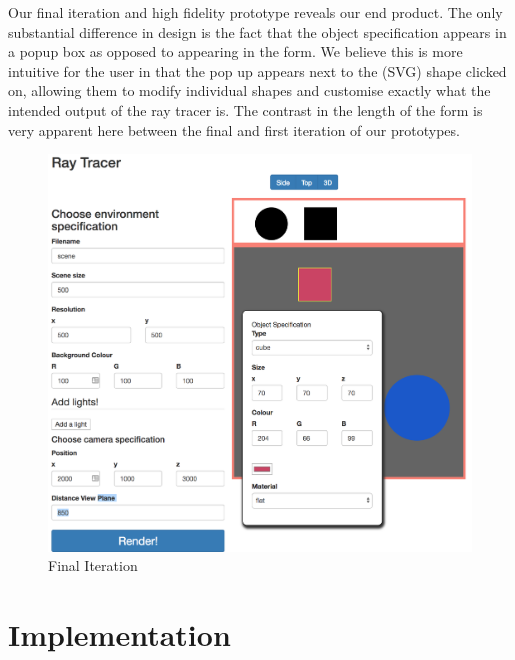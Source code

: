 \documentclass[a4paper]{report}
\begin{document}
	Our final iteration and high fidelity prototype reveals our end product. The only substantial difference in design is the fact that the object specification appears in a popup box as opposed to appearing in the form. We believe this is more intuitive for the user in that the pop up appears next to the (SVG) shape clicked on, allowing them to modify individual shapes and customise exactly what the intended output of the ray tracer is. The contrast in the length of the form is very apparent here between the final and first iteration of our prototypes.
	\begin{figure}[ht!]
		\centering
		\includegraphics[scale=0.3]{final-all.png}
		\caption{Final Iteration}
		\label{fig:final}
	\end{figure}
	\chapter{Implementation}
	
\end{document}

